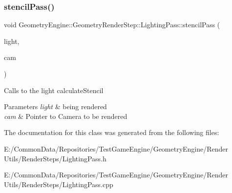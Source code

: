 \subsubsection{\texorpdfstring{stencilPass()}{stencilPass()}}
{\footnotesize\ttfamily void Geometry\+Engine\+::\+Geometry\+Render\+Step\+::\+Lighting\+Pass\+::stencil\+Pass (\begin{DoxyParamCaption}\item[{\mbox{\hyperlink{class_geometry_engine_1_1_geometry_world_item_1_1_geometry_light_1_1_light}{Geometry\+World\+Item\+::\+Geometry\+Light\+::\+Light}} $\ast$}]{light,  }\item[{\mbox{\hyperlink{class_geometry_engine_1_1_geometry_world_item_1_1_geometry_camera_1_1_camera}{Geometry\+World\+Item\+::\+Geometry\+Camera\+::\+Camera}} $\ast$}]{cam }\end{DoxyParamCaption})\hspace{0.3cm}{\ttfamily [protected]}}

Calls to the light calculate\+Stencil 
\begin{DoxyParams}{Parameters}
{\em light} & being rendered \\
\hline
{\em cam} & Pointer to Camera to be rendered \\
\hline
\end{DoxyParams}


The documentation for this class was generated from the following files\+:\begin{DoxyCompactItemize}
\item 
E\+:/\+Common\+Data/\+Repositories/\+Test\+Game\+Engine/\+Geometry\+Engine/\+Render Utils/\+Render\+Steps/Lighting\+Pass.\+h\item 
E\+:/\+Common\+Data/\+Repositories/\+Test\+Game\+Engine/\+Geometry\+Engine/\+Render Utils/\+Render\+Steps/Lighting\+Pass.\+cpp\end{DoxyCompactItemize}
